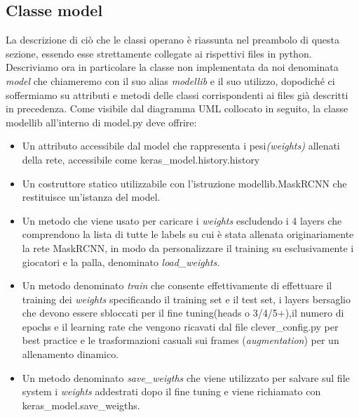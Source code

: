\subsection*{Classe model}
La descrizione di ciò che le classi operano è riassunta nel preambolo di questa sezione, essendo esse strettamente collegate ai rispettivi files in python. Descriviamo ora in particolare la classe non implementata da noi denominata \emph{model} che chiameremo con il suo alias \emph{modellib} e il suo utilizzo, dopodiché ci soffermiamo su attributi e metodi delle classi corrispondenti ai files già descritti in precedenza.
Come visibile dal diagramma UML collocato in seguito, la classe modellib all'interno di model.py deve offrire:
\begin{itemize}
\item Un attributo accessibile dal model che rappresenta i pesi\emph{(weights)} allenati della rete, accessibile come keras\_model.history.history
\item Un costruttore statico utilizzabile con l'istruzione modellib.MaskRCNN che restituisce un'istanza del model.
\item Un metodo che viene usato per caricare i \emph{weights} escludendo i 4 layers che comprendono la lista di tutte le labels su cui è stata allenata originariamente la rete MaskRCNN, in modo da personalizzare il training su esclusivamente i giocatori e la palla, denominato \emph{load\_weights.}
\item Un metodo denominato \emph{train} che consente effettivamente di effettuare il training dei \emph{weights} specificando il training set e il test set, i layers bersaglio che devono essere sbloccati per il fine tuning(heads o 3/4/5+),il numero di epochs e il learning rate che vengono ricavati dal file clever\_config.py per best practice e le trasformazioni casuali sui frames (\emph{augmentation}) per un allenamento dinamico.
\item Un metodo denominato \emph{save\_weigths} che viene utilizzato per salvare sul file system i \emph{weights} addestrati dopo il fine tuning e viene richiamato con keras\_model.save\_weigths.
\end{itemize}

